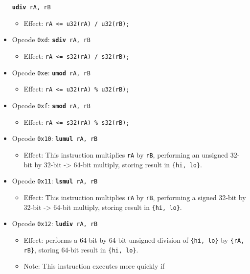 \documentclass{article}
\begin{document}
\begin{itemize}
		\texttt{\textbf{udiv} rA, rB}
		\begin{itemize}
		\item Effect: \texttt{rA <= u32(rA) / u32(rB);}
		\end{itemize}
	\item Opcode \texttt{0xd}:
		\texttt{\textbf{sdiv} rA, rB}
		\begin{itemize}
		\item Effect: \texttt{rA <= s32(rA) / s32(rB);}
		\end{itemize}
	\item Opcode \texttt{0xe}:
		\texttt{\textbf{umod} rA, rB}
		\begin{itemize}
		\item Effect: \texttt{rA <= u32(rA) \% u32(rB);}
		\end{itemize}
	\item Opcode \texttt{0xf}:
		\texttt{\textbf{smod} rA, rB}
		\begin{itemize}
		\item Effect: \texttt{rA <= s32(rA) \% s32(rB);}
		\end{itemize}
	\item Opcode \texttt{0x10}:
		\texttt{\textbf{lumul} rA, rB}
		\begin{itemize}
		\item Effect: This instruction multiplies \texttt{rA} by
		\texttt{rB}, performing an unsigned 32-bit by 32-bit -> 64-bit
		multiply, storing result in \texttt{\{hi, lo\}}.
		\end{itemize}
	\item Opcode \texttt{0x11}:
		\texttt{\textbf{lsmul} rA, rB}
		\begin{itemize}
		\item Effect: This instruction multiplies \texttt{rA} by
		\texttt{rB}, performing a signed 32-bit by 32-bit -> 64-bit
		multiply, storing result in \texttt{\{hi, lo\}}.
		\end{itemize}
	\item Opcode \texttt{0x12}:
		\texttt{\textbf{ludiv} rA, rB}
		\begin{itemize}
		\item Effect: performs a 64-bit by 64-bit unsigned division of
		\texttt{\{hi, lo\}} by \texttt{\{rA, rB\}}, storing 64-bit
		result in \texttt{\{hi, lo\}}.
		\item Note: This instruction executes more quickly if

\end{itemize}
\end{itemize}
\end{document}
